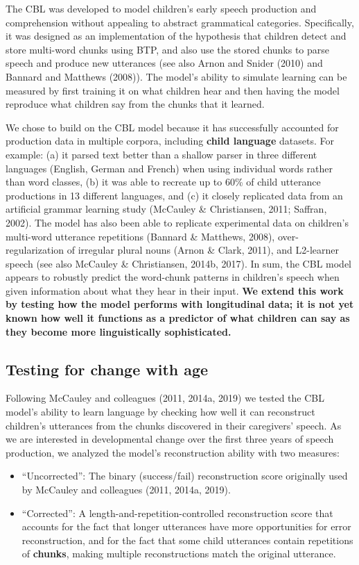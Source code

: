 \documentclass[man,mask,floatsintext]{apa6}
\providecommand{\tightlist}{%
  \setlength{\itemsep}{0pt}\setlength{\parskip}{0pt}}
\begin{document}
The CBL was developed to model children's early speech production and
comprehension without appealing to abstract grammatical categories.
Specifically, it was designed as an implementation of the hypothesis
that children detect and store multi-word chunks using BTP, and also use
the stored chunks to parse speech and produce new utterances (see also
Arnon and Snider (2010) and Bannard and Matthews (2008)). The model's
ability to simulate learning can be measured by first training it on
what children hear and then having the model reproduce what children say
from the chunks that it learned.

We chose to build on the CBL model because it has successfully accounted
for production data in multiple corpora, including \textbf{child
language} datasets. For example: (a) it parsed text better than a
shallow parser in three different languages (English, German and French)
when using individual words rather than word classes, (b) it was able to
recreate up to 60\% of child utterance productions in 13 different
languages, and (c) it closely replicated data from an artificial grammar
learning study (McCauley \& Christiansen, 2011; Saffran, 2002). The
model has also been able to replicate experimental data on children's
multi-word utterance repetitions (Bannard \& Matthews, 2008),
over-regularization of irregular plural nouns (Arnon \& Clark, 2011),
and L2-learner speech (see also McCauley \& Christiansen, 2014b, 2017).
In sum, the CBL model appears to robustly predict the word-chunk
patterns in children's speech when given information about what they
hear in their input. \textbf{We extend this work by testing how the
model performs with longitudinal data; it is not yet known how well it
functions as a predictor of what children can say as they become more
linguistically sophisticated.}

\subsection{Testing for change with
age}\label{testing-for-change-with-age}

Following McCauley and colleagues (2011, 2014a, 2019) we tested the CBL
model's ability to learn language by checking how well it can
reconstruct children's utterances from the chunks discovered in their
caregivers' speech. As we are interested in developmental change over
the first three years of speech production, we analyzed the model's
reconstruction ability with two measures:

\begin{itemize}
\tightlist
\item
  \enquote{Uncorrected}: The binary (success/fail) reconstruction score
  originally used by McCauley and colleagues (2011, 2014a, 2019).
\item
  \enquote{Corrected}: A length-and-repetition-controlled reconstruction
  score that accounts for the fact that longer utterances have more
  opportunities for error reconstruction, and for the fact that some
  child utterances contain repetitions of \textbf{chunks}, making
  multiple reconstructions match the original utterance.
\end{itemize}
\end{document}
